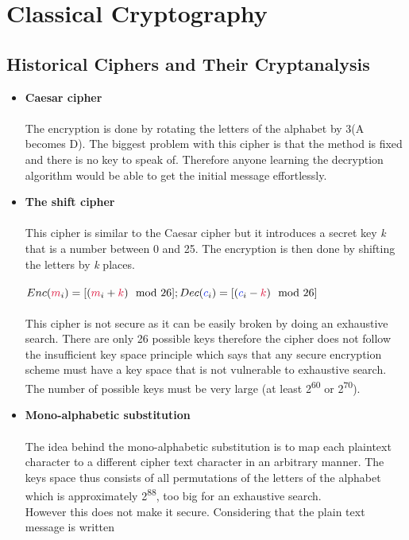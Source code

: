 \chapter{Classical Cryptography}

\section{Historical Ciphers and Their Cryptanalysis}

	\begin{itemize}
	    \item \textbf{Caesar cipher}\\\\
	The encryption is done by rotating the letters of the alphabet by 3(A becomes D). The biggest problem
	with this cipher is that the method is fixed and there is no key to speak of. Therefore anyone
	learning the decryption algorithm would be able to get the initial message effortlessly.
	    \item \textbf{The shift cipher}\\\\
	This cipher is similar to the Caesar cipher but it introduces a secret key \textit{k} that is a number
	between 0 and 25. The encryption is then done by shifting the letters by \textit{k} places.\\\\
	$Enc(\cm_{i}) = [(\cm_i+\ck) \mod 26];\\
	Dec(\cc_{i}) = [(\cc_{i}-\ck) \mod 26]$\\\\
	This cipher is not secure as it can be easily broken by doing an exhaustive search. There are
	only 26 possible keys therefore the cipher does not follow the insufficient key space principle
	which says that any secure encryption scheme must have a key space that is not vulnerable to
	exhaustive search. The number of possible keys must be very large (at least 2\textsuperscript{60} or 2\textsuperscript{70}).
	    \item \textbf{Mono-alphabetic substitution}\\\\
	The idea behind the mono-alphabetic substitution is to map each plaintext character to a
	different cipher text character in an arbitrary manner. The keys space thus consists of all
	permutations of the letters of the alphabet which is approximately 2\textsuperscript{88}, too big for an exhaustive search.\\
	However this does not make it secure. Considering that the plain text message is written

\end{itemize}
